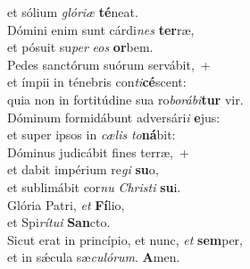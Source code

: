 \evenverse et sólium \textit{gló}\textit{ri}\textit{æ} \textbf{té}neat.\\
\oddverse Dómini enim sunt cárdi\textit{nes} \textbf{ter}ræ,~\*\\
\oddverse et pósuit su\textit{per} \textit{e}\textit{os} \textbf{or}bem.\\
\evenverse Pedes sanctórum suórum servábit,~+\\
\evenverse  et ímpii in ténebris con\textit{ti}\textbf{cé}scent:~\*\\
\evenverse quia non in fortitúdine sua ro\textit{bo}\textit{rá}\textit{bi}\textbf{tur} vir.\\
\oddverse Dóminum formidábunt adversári\textit{i} \textbf{e}jus:~\*\\
\oddverse et super ipsos in \textit{cæ}\textit{lis} \textit{to}\textbf{ná}bit:\\
\evenverse Dóminus judicábit fines terræ,~+\\
\evenverse  et dabit impérium re\textit{gi} \textbf{su}o,~\*\\
\evenverse et sublimábit cor\textit{nu} \textit{Chri}\textit{sti} \textbf{su}i.\\
\oddverse Glória Patri, \textit{et} \textbf{Fí}lio,~\*\\
\oddverse et Spi\textit{rí}\textit{tu}\textit{i} \textbf{San}cto.\\
\evenverse Sicut erat in princípio, et nunc, \textit{et} \textbf{sem}per,~\*\\
\evenverse et in sǽcula sæ\textit{cu}\textit{ló}\textit{rum}. \textbf{A}men.\\
